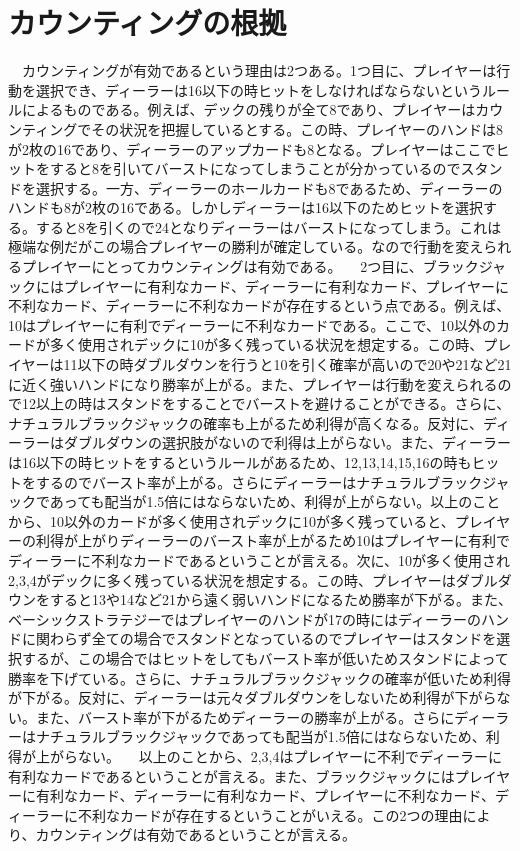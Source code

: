 \section{カウンティングの根拠}
\ \ カウンティングが有効であるという理由は2つある。1つ目に、プレイヤーは行動を選択でき、ディーラーは16以下の時ヒットをしなければならないというルールによるものである。例えば、デックの残りが全て8であり、プレイヤーはカウンティングでその状況を把握しているとする。この時、プレイヤーのハンドは8が2枚の16であり、ディーラーのアップカードも8となる。プレイヤーはここでヒットをすると8を引いてバーストになってしまうことが分かっているのでスタンドを選択する。一方、ディーラーのホールカードも8であるため、ディーラーのハンドも8が2枚の16である。しかしディーラーは16以下のためヒットを選択する。すると8を引くので24となりディーラーはバーストになってしまう。これは極端な例だがこの場合プレイヤーの勝利が確定している。なので行動を変えられるプレイヤーにとってカウンティングは有効である。
\ \ 2つ目に、ブラックジャックにはプレイヤーに有利なカード、ディーラーに有利なカード、プレイヤーに不利なカード、ディーラーに不利なカードが存在するという点である。例えば、10はプレイヤーに有利でディーラーに不利なカードである。ここで、10以外のカードが多く使用されデックに10が多く残っている状況を想定する。この時、プレイヤーは11以下の時ダブルダウンを行うと10を引く確率が高いので20や21など21に近く強いハンドになり勝率が上がる。また、プレイヤーは行動を変えられるので12以上の時はスタンドをすることでバーストを避けることができる。さらに、ナチュラルブラックジャックの確率も上がるため利得が高くなる。反対に、ディーラーはダブルダウンの選択肢がないので利得は上がらない。また、ディーラーは16以下の時ヒットをするというルールがあるため、12,13,14,15,16の時もヒットをするのでバースト率が上がる。さらにディーラーはナチュラルブラックジャックであっても配当が1.5倍にはならないため、利得が上がらない。以上のことから、10以外のカードが多く使用されデックに10が多く残っていると、プレイヤーの利得が上がりディーラーのバースト率が上がるため10はプレイヤーに有利でディーラーに不利なカードであるということが言える。次に、10が多く使用され2,3,4がデックに多く残っている状況を想定する。この時、プレイヤーはダブルダウンをすると13や14など21から遠く弱いハンドになるため勝率が下がる。また、ベーシックストラテジーではプレイヤーのハンドが17の時にはディーラーのハンドに関わらず全ての場合でスタンドとなっているのでプレイヤーはスタンドを選択するが、この場合ではヒットをしてもバースト率が低いためスタンドによって勝率を下げている。さらに、ナチュラルブラックジャックの確率が低いため利得が下がる。反対に、ディーラーは元々ダブルダウンをしないため利得が下がらない。また、バースト率が下がるためディーラーの勝率が上がる。さらにディーラーはナチュラルブラックジャックであっても配当が1.5倍にはならないため、利得が上がらない。
\ \ 以上のことから、2,3,4はプレイヤーに不利でディーラーに有利なカードであるということが言える。また、ブラックジャックにはプレイヤーに有利なカード、ディーラーに有利なカード、プレイヤーに不利なカード、ディーラーに不利なカードが存在するということがいえる。この2つの理由により、カウンティングは有効であるということが言える。

